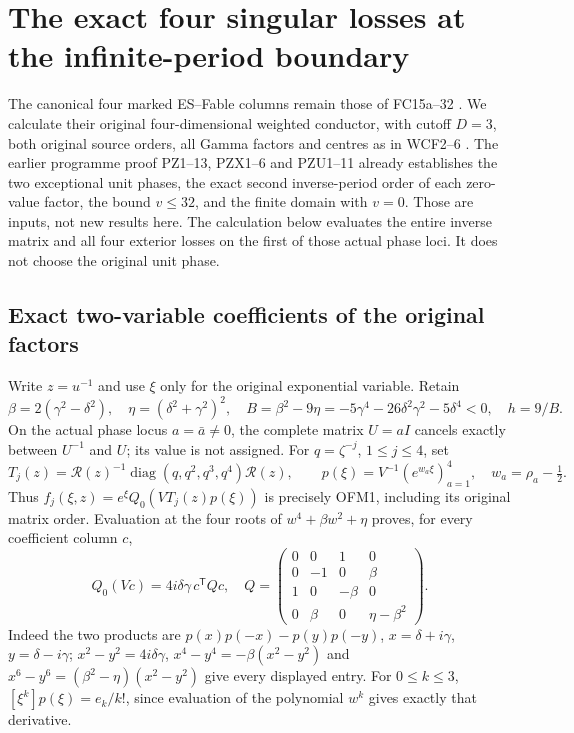 \section{The exact four singular losses at the infinite-period boundary}
The canonical four marked ES--Fable columns remain those of
FC15a--32 \cite{ES488}. We calculate their original four-dimensional
weighted conductor, with cutoff $D=3$, both original source orders,
all Gamma factors and centres as in WCF2--6 \cite{WCF,DLMF18Source}.
The earlier programme proof PZ1--13, PZX1--6 and PZU1--11
\cite{PeriodZeroOriginal} already establishes the two exceptional
unit phases, the exact second inverse-period order of each zero-value
factor, the bound $v\le32$, and the finite domain with $v=0$.
Those are inputs, not new results here. The calculation below evaluates
the entire inverse matrix and all four exterior losses on the first
of those actual phase loci. It does not choose the original unit phase.

\subsection{Exact two-variable coefficients of the original factors}
Write $z=u^{-1}$ and use $\xi$ only for the original exponential
variable. Retain
\[
 \beta=2(\gamma^2-\delta^2),\quad
 \eta=(\delta^2+\gamma^2)^2,\quad
 B=\beta^2-9\eta=-5\gamma^4-26\delta^2\gamma^2-5\delta^4<0,
 \quad h=9/B.
 \tag{PIN1}
\]
On the actual phase locus $a=\bar a\ne0$, the complete matrix
$U=aI$ cancels exactly between $U^{-1}$ and $U$; its value is not
assigned. For $q=\zeta^{-j}$, $1\le j\le4$, set
\[
 T_j(z)=\mathcal R(z)^{-1}
       \operatorname{diag}(q,q^2,q^3,q^4)\mathcal R(z),\qquad
 p(\xi)=V^{-1}(e^{w_a\xi})_{a=1}^4,\quad w_a=\rho_a-\tfrac12.
 \tag{PIN2}
\]
Thus $f_j(\xi,z)=e^\xi Q_0(VT_j(z)p(\xi))$ is precisely OFM1,
including its original matrix order. Evaluation at the four roots of
$w^4+\beta w^2+\eta$ proves, for every coefficient column $c$,
\[
 Q_0(Vc)=4i\delta\gamma\,c^{\mathsf T}Qc,\quad
 Q=\begin{pmatrix}0&0&1&0\\0&-1&0&\beta\\
 1&0&-\beta&0\\0&\beta&0&\eta-\beta^2\end{pmatrix}.
 \tag{PIN3}
\]
Indeed the two products are $p(x)p(-x)-p(y)p(-y)$,
$x=\delta+i\gamma$, $y=\delta-i\gamma$;
$x^2-y^2=4i\delta\gamma$,
$x^4-y^4=-\beta(x^2-y^2)$ and
$x^6-y^6=(\beta^2-\eta)(x^2-y^2)$ give every displayed entry.
For $0\le k\le3$, $[\xi^k]p(\xi)=e_k/k!$, since evaluation
of the polynomial $w^k$ gives exactly that derivative.


